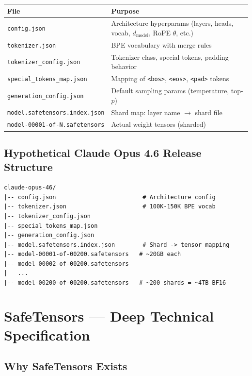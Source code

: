 \documentclass[11pt,a4paper]{article}
\begin{document}
\begin{center}
\begin{tabular}{lL{9cm}}
\toprule
\textbf{File} & \textbf{Purpose} \\
\midrule
\texttt{config.json} & Architecture hyperparams (layers, heads, vocab, $d_{\text{model}}$, RoPE $\theta$, etc.) \\
\texttt{tokenizer.json} & BPE vocabulary with merge rules \\
\texttt{tokenizer\_config.json} & Tokenizer class, special tokens, padding behavior \\
\texttt{special\_tokens\_map.json} & Mapping of \texttt{<bos>}, \texttt{<eos>}, \texttt{<pad>} tokens \\
\texttt{generation\_config.json} & Default sampling params (temperature, top-$p$) \\
\texttt{model.safetensors.index.json} & Shard map: layer name $\to$ shard file \\
\texttt{model-00001-of-N.safetensors} & Actual weight tensors (sharded) \\
\bottomrule
\end{tabular}
\end{center}

\subsection{Hypothetical Claude Opus 4.6 Release Structure}

\begin{lstlisting}[basicstyle=\ttfamily\small, caption={Complete File Layout for 2T BF16 Model}]
claude-opus-46/
|-- config.json                         # Architecture config
|-- tokenizer.json                      # 100K-150K BPE vocab
|-- tokenizer_config.json
|-- special_tokens_map.json
|-- generation_config.json
|-- model.safetensors.index.json        # Shard -> tensor mapping
|-- model-00001-of-00200.safetensors   # ~20GB each
|-- model-00002-of-00200.safetensors
|   ...
|-- model-00200-of-00200.safetensors   # ~200 shards = ~4TB BF16
\end{lstlisting}

\section{SafeTensors --- Deep Technical Specification}

\subsection{Why SafeTensors Exists}
\end{document}

